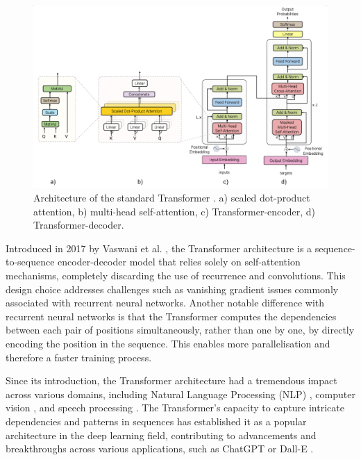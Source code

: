 \begin{figure}[ht]
    \centering
    \includegraphics[width=1\textwidth]{imgs/transformer_archi.png}
    \caption{Architecture of the standard Transformer \cite{vaswani2017attention}. a) scaled dot-product attention, b) multi-head self-attention, c) Transformer-encoder, d) Transformer-decoder.}
    \label{fig:transformer_archi}
\end{figure}
Introduced in 2017 by Vaswani et al. \cite{vaswani2017attention}, the Transformer architecture is a sequence-to-sequence encoder-decoder model that relies solely on self-attention mechanisms, completely discarding the use of recurrence and convolutions. This design choice addresses challenges such as vanishing gradient issues commonly associated with recurrent neural networks. Another notable difference with recurrent neural networks is that the Transformer computes the dependencies between each pair of positions simultaneously, rather than one by one, by directly encoding the position in the sequence. This enables more parallelisation and therefore a faster training process.

Since its introduction, the Transformer architecture had a tremendous impact across various domains, including Natural Language Processing (NLP) \cite{Bert,brown2020language}, computer vision \cite{dosovitskiy2020image}, and speech processing \cite{dong2018speech}. The Transformer's capacity to capture intricate dependencies and patterns in sequences has established it as a popular architecture in the deep learning field, contributing to advancements and breakthroughs across various applications, such as ChatGPT \cite{bahrini2023chatgpt} or Dall-E \cite{ramesh2021zero}.

